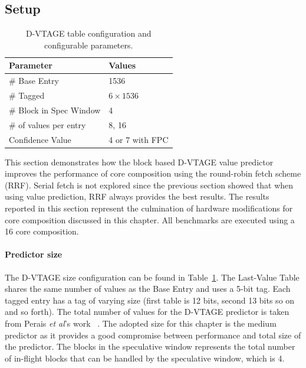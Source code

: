 \vspace{-1em}
\subsection{Setup}

\begin{table}[t]
\smaller
\centering
\begin{tabular}{p{5.2cm} p{3cm}}
\toprule
\textbf{Parameter} & \textbf{Values} \\ \midrule
\# Base Entry & 1536\\
\# Tagged & $6\times1536$\\
\# Block in Spec Window & 4 \\ \hline \midrule
\# of values per entry & 8, 16\\
Confidence Value & 4 or 7 with FPC \\ \bottomrule
\end{tabular}
  \caption{D-VTAGE table configuration and configurable parameters.}\label{tab:vtage-conf}
\vspace{1em}
\end{table}

This section demonstrates how the block based D-VTAGE value predictor improves the performance of core composition using the round-robin fetch scheme (RRF).
Serial fetch is not explored since the previous section showed that when using value prediction, RRF always provides the best results.
The results reported in this section represent the culmination of hardware modifications for core composition discussed in this chapter.
All benchmarks are executed using a 16 core composition.

\paragraph*{Predictor size}
The D-VTAGE size configuration can be found in Table~\ref{tab:vtage-conf}.
The Last-Value Table shares the same number of values as the Base Entry and uses a 5-bit tag.
Each tagged entry has a tag of varying size (first table is 12 bits, second 13 bits so on and so forth).
The total number of values for the D-VTAGE predictor is taken from Perais {\it et al}'s work ~\cite{peraisBeBop2015}.
The adopted size for this chapter is the medium predictor as it provides a good compromise between performance and total size of the predictor.
The blocks in the speculative window represents the total number of in-flight blocks that can be handled by the speculative window, which is 4.

